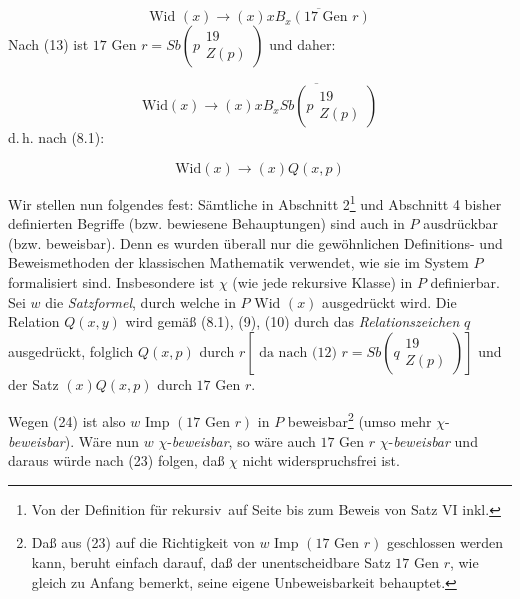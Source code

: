 \documentclass[draft]{scrartcl}
\begin{document}
\begin{equation*}
\text{Wid }\left(x\right) \longrightarrow \left(x\right)\overline{x B_x \left(17\text{ Gen } r\right)}
\end{equation*}
Nach (13) ist $17\text{ Gen } r = Sb\left(p\substack{19\\ Z\left(p\right)}\right)$ und daher:

\begin{equation*}
\text{Wid}\left(x\right) \longrightarrow\left(x\right)\overline{x B_x Sb\left(p\substack{19\\ Z\left(p\right)}\right)}
\end{equation*}
d.\,h. nach (8.1):

\begin{equation}
\text{Wid}\left(x\right) \longrightarrow \left(x\right) Q\left(x, p\right)
\end{equation}

Wir stellen nun folgendes fest: Sämtliche in Abschnitt 2\footnote{Von der Definition für
\glqq rekursiv\grqq\ auf Seite \pageref{zwischenbetrachtungrekursion} bis zum Beweis von Satz VI inkl.}
und Abschnitt 4 bisher definierten Begriffe (bzw. bewiesene Behauptungen) sind auch in
$P$ ausdrückbar (bzw. beweisbar). Denn es wurden überall nur die gewöhnlichen Definitions-
und Beweismethoden der klassischen Mathematik verwendet, wie sie im System $P$ formalisiert
sind. Insbesondere ist $\chi$ (wie jede rekursive Klasse) in $P$ definierbar.
Sei $w$ die \textit{Satzformel}, durch welche in $P\text{ Wid } \left(x\right)$
ausgedrückt wird. Die Relation $Q\left(x, y\right)$ wird gemäß (8.1), (9), (10)
durch das \textit{Relationszeichen} $q$ ausgedrückt, folglich
$Q\left(x, p\right)$ durch $r \left[\text{ da nach (12) } r = Sb\left(q\substack{19\\ Z\left(p\right)}\right)\right]$
und der Satz $\left(x\right)Q\left(x, p\right)$ durch $17\text{ Gen } r$.

Wegen (24) ist also $w\text{ Imp } \left(17\text{ Gen }r\right)$
in $P$ beweisbar\footnote{Daß aus (23) auf die Richtigkeit von
$w\text{ Imp }\left(17\text{ Gen } r\right)$
geschlossen werden kann, beruht einfach darauf, daß der unentscheidbare Satz %
$17\text{ Gen }r$, wie gleich zu Anfang bemerkt, seine eigene Unbeweisbarkeit behauptet.}
(umso mehr $\chi$-\textit{beweisbar}). Wäre nun $w$ $\chi$-\textit{beweisbar},
so wäre auch $17\text{ Gen }r$ $\chi$-\textit{beweisbar} und daraus würde nach (23)
folgen, daß $\chi$ nicht widerspruchsfrei ist.
\end{document}
